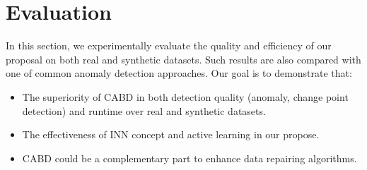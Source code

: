 \section{Evaluation}


In this section, we experimentally evaluate the quality and efficiency of our proposal on both real and synthetic datasets. Such results are also compared with one of common anomaly detection approaches. Our goal is to demonstrate that:
\begin{itemize}
    \item The superiority of CABD in both detection quality (anomaly, change point detection) and runtime over real and synthetic datasets. 
    \item The effectiveness of INN concept and active learning in our propose.
    \item CABD could be a complementary part to enhance data repairing algorithms.
\end{itemize}





